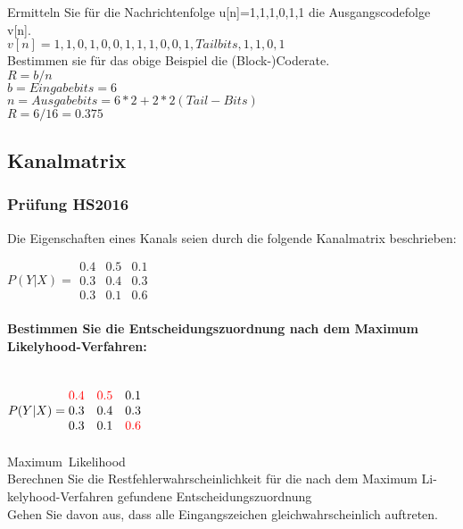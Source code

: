 Ermitteln Sie für die Nachrichtenfolge {u[n]}={1,1,1,0,1,1} die Ausgangscodefolge {v[n]}.\\
${v[n]}={1,1,0,1,0,0,1,1,1,0,0,1,Tailbits,1,1,0,1}$\\

Bestimmen sie für das obige Beispiel die (Block-)Coderate.\\
$R=b/n$\\
$b=Eingabebits=6$\\
$n=Ausgabebits=6*2+2*2 (Tail-Bits)$\\
$R=6/16=0.375$

\subsection{Kanalmatrix}
\subsubsection{Prüfung HS2016}
Die Eigenschaften eines Kanals seien durch die folgende Kanalmatrix beschrieben: 

$P(Y|X) = \begin{matrix}
    0.4 & 0.5 & 0.1\\
    0.3 & 0.4 & 0.3\\
    0.3 & 0.1 & 0.6
\end{matrix}$

\paragraph{Bestimmen Sie die Entscheidungszuordnung nach dem Maximum Likelyhood-Verfahren:}\mbox{}\\
$P(Y|X) = \begin{matrix}
    \textcolor{red}{0.4} & \textcolor{red}{0.5} & 0.1\\
    0.3 & 0.4 & 0.3\\
    0.3 & 0.1 & \textcolor{red}{0.6}
\end{matrix}$

\paragraph{}\mbox{Maximum Likelihood}\\
Berechnen Sie die Restfehlerwahrscheinlichkeit für die nach dem Maximum Li-kelyhood-Verfahren gefundene Entscheidungszuordnung\\
Gehen Sie davon aus, dass alle Eingangszeichen gleichwahrscheinlich auftreten.\\

